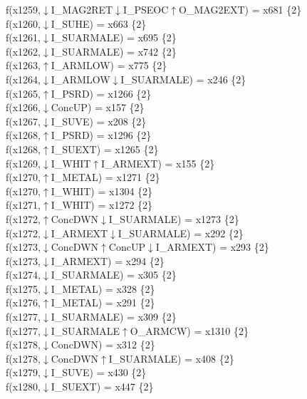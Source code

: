 f(x1259,$\downarrow$I\_MAG2RET$\downarrow$I\_PSEOC$\uparrow$O\_MAG2EXT) = x681 \{2\} \\  
f(x1260,$\downarrow$I\_SUHE) = x663 \{2\} \\  
f(x1261,$\downarrow$I\_SUARMALE) = x695 \{2\} \\  
f(x1262,$\downarrow$I\_SUARMALE) = x742 \{2\} \\  
f(x1263,$\uparrow$I\_ARMLOW) = x775 \{2\} \\  
f(x1264,$\downarrow$I\_ARMLOW$\downarrow$I\_SUARMALE) = x246 \{2\} \\  
f(x1265,$\uparrow$I\_PSRD) = x1266 \{2\} \\  
f(x1266,$\downarrow$ConcUP) = x157 \{2\} \\  
f(x1267,$\downarrow$I\_SUVE) = x208 \{2\} \\  
f(x1268,$\uparrow$I\_PSRD) = x1296 \{2\} \\  
f(x1268,$\uparrow$I\_SUEXT) = x1265 \{2\} \\  
f(x1269,$\downarrow$I\_WHIT$\uparrow$I\_ARMEXT) = x155 \{2\} \\  
f(x1270,$\uparrow$I\_METAL) = x1271 \{2\} \\  
f(x1270,$\uparrow$I\_WHIT) = x1304 \{2\} \\  
f(x1271,$\uparrow$I\_WHIT) = x1272 \{2\} \\  
f(x1272,$\uparrow$ConcDWN$\downarrow$I\_SUARMALE) = x1273 \{2\} \\  
f(x1272,$\downarrow$I\_ARMEXT$\downarrow$I\_SUARMALE) = x292 \{2\} \\  
f(x1273,$\downarrow$ConcDWN$\uparrow$ConcUP$\downarrow$I\_ARMEXT) = x293 \{2\} \\  
f(x1273,$\downarrow$I\_ARMEXT) = x294 \{2\} \\  
f(x1274,$\downarrow$I\_SUARMALE) = x305 \{2\} \\  
f(x1275,$\downarrow$I\_METAL) = x328 \{2\} \\  
f(x1276,$\uparrow$I\_METAL) = x291 \{2\} \\  
f(x1277,$\downarrow$I\_SUARMALE) = x309 \{2\} \\  
f(x1277,$\downarrow$I\_SUARMALE$\uparrow$O\_ARMCW) = x1310 \{2\} \\  
f(x1278,$\downarrow$ConcDWN) = x312 \{2\} \\  
f(x1278,$\downarrow$ConcDWN$\uparrow$I\_SUARMALE) = x408 \{2\} \\  
f(x1279,$\downarrow$I\_SUVE) = x430 \{2\} \\  
f(x1280,$\downarrow$I\_SUEXT) = x447 \{2\} \\  

